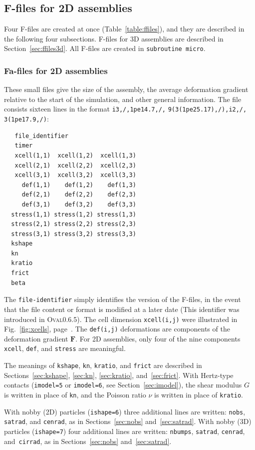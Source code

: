 \documentclass[letterpaper,11pt]{article}
\newcommand{\Oval}{\textsc{Oval}}
\begin{document}
\subsection{F-files for 2D assemblies}\label{sec:ffiles2d}
Four F-files are created at once (Table~\ref{table:ffiles}),
and they are described in the following four subsections.
F-files for 3D assemblies are described in Section~\ref{sec:ffiles3d}.
All F-files are created in \texttt{subroutine micro}.
\subsubsection{Fa-files for 2D assemblies}\label{sec:f1files}
These small files give the size of the assembly, the 
average deformation gradient relative to the start of the simulation,
and other general information.
The file consists sixteen lines
in the format \texttt{i3,/,}\texttt{1pe14.7,/,}
\texttt{9(3(1pe25.17),/),i2,/,}
\texttt{3(1pe17.9,/)}:
\begin{verbatim}
   file_identifier
   timer
   xcell(1,1)  xcell(1,2)  xcell(1,3)
   xcell(2,1)  xcell(2,2)  xcell(2,3)
   xcell(3,1)  xcell(3,2)  xcell(3,3)
     def(1,1)    def(1,2)    def(1,3)
     def(2,1)    def(2,2)    def(2,3)
     def(3,1)    def(3,2)    def(3,3)
  stress(1,1) stress(1,2) stress(1,3)
  stress(2,1) stress(2,2) stress(2,3)
  stress(3,1) stress(3,2) stress(3,3)
  kshape
  kn
  kratio
  frict
  beta
\end{verbatim}
The \texttt{file-identifier} simply identifies the version of the F-files,
in the event that the file content or format is modified at a later date
(This identifier was introduced in \Oval0.6.5).
The cell dimension \texttt{xcell(i,j)} were illustrated in
Fig.~\ref{fig:xcells}, page~\pageref{fig:xcells}.
The \texttt{def(i,j)} deformations are components of the
deformation gradient $\mathbf{F}$.
For 2D assemblies,
only four of the nine components 
\texttt{xcell}, \texttt{def}, and \texttt{stress} are meaningful.
\par
The meanings of \texttt{kshape}, \texttt{kn}, \texttt{kratio}, 
and \texttt{frict}
are described in Sections~\ref{sec:kshape}, \ref{sec:kn},
\ref{sec:kratio}, and~\ref{sec:frict}.
With Hertz-type contacts (\texttt{imodel=5} or \texttt{imodel=6},
see Section~\ref{sec:imodel}),
the shear modulus $G$ is written in place of \texttt{kn},
and the Poisson ratio $\nu$ is written in place of \texttt{kratio}.
\par
With nobby (2D) particles (\texttt{ishape=6}) three additional lines are written:
\texttt{nobs}, \texttt{satrad}, and \texttt{cenrad}, as in
Sections~\ref{sec:nobs} and~\ref{sec:satrad}.
With nobby (3D) particles (\texttt{ishape=7}) four additional lines are written:
\texttt{nbumps}, \texttt{satrad}, \texttt{cenrad}, and~\texttt{cirrad}, as in
Sections~\ref{sec:nobs} and~\ref{sec:satrad}.
%
\end{document}
